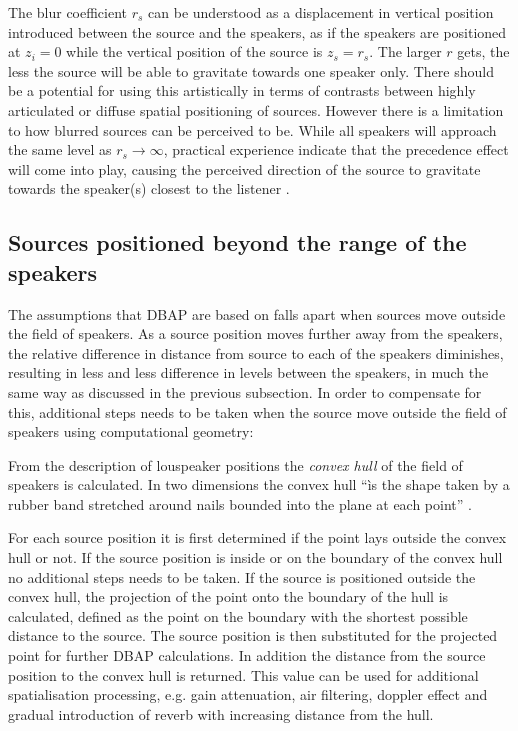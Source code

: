 \documentclass[twoside,10pt]{article}
\begin{document}
The blur coefficient $r_{s}$ can be understood as a displacement in vertical position introduced between the source and the speakers, as if the speakers are positioned at $z_{i}=0$ while the vertical position of the source is $z_{s}=r_{s}$. The larger $r$ gets, the less the source will be able to gravitate towards one speaker only. There should be a potential for using this artistically in terms of contrasts between highly articulated or diffuse spatial positioning of sources. However there is a limitation to how blurred sources can be perceived to be. While all speakers will approach the same level as $ r_{s} \rightarrow \infty $, practical experience indicate that the precedence effect will come into play, causing the perceived direction of the source to gravitate towards the speaker(s) closest to the listener \cite{Litovsky:1999precedence_effect}.





\subsection{Sources positioned beyond the range of the speakers}


The assumptions that DBAP are based on falls apart when sources move outside the field of speakers. As a source position moves further away from the speakers, the relative difference in distance from source to each of the speakers diminishes, resulting in less and less difference in levels between the speakers, in much the same way as discussed in the previous subsection. In order to compensate for this, additional steps needs to be taken when the source move outside the field of speakers using computational geometry:

From the description of louspeaker positions the \emph{convex hull} of the field of speakers is calculated. In two dimensions the convex hull ``ìs the shape taken by a rubber band stretched around nails bounded into the plane at each point'' \cite{Rourke:1998_geometry}.

For each source position it is first determined if the point lays outside the convex hull or not. If the source position is inside or on the boundary of the convex hull no additional steps needs to be taken. If the source is positioned outside the convex hull, the projection of the point onto the boundary of the hull is calculated, defined as the point on the boundary with the shortest possible distance to the source. The source position is then substituted for the projected point for further DBAP calculations. In addition the distance from the source position to the convex hull is returned. This value can be used for additional spatialisation processing, e.g. gain attenuation, air filtering, doppler effect and gradual introduction of reverb with increasing distance from the hull.
\end{document}
